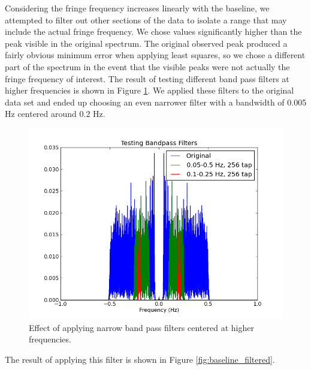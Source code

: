 \documentclass{article}
\begin{document}
    Considering the fringe frequency increases linearly with the baseline, we
    attempted to filter out other sections of the data to isolate a range that
    may include the actual fringe frequency. We chose values significantly
    higher than the peak visible in the original spectrum.  The original
    observed peak produced a fairly obvious minimum error when applying least
    squares, so we chose a different part of the spectrum in the event that the
    visible peaks were not actually the fringe frequency of interest.  The result of testing different
    band pass filters at higher frequencies is shown in Figure
    \ref{fig:bandpass_test_b}. We applied these filters to the original data set
    and ended up choosing an even narrower filter with a bandwidth of 0.005 Hz
    centered around 0.2 Hz.

    \begin{figure}[h!]
    \centering
    \includegraphics[scale=0.5]{img/crab/bandpass_test_b.png}
    \caption{Effect of applying narrow band pass filters centered at higher frequencies.}
    \label{fig:bandpass_test_b}
    \end{figure}

    The result of applying this filter is shown in Figure
    \ref{fig:baseline_filtered}.
\end{document}
